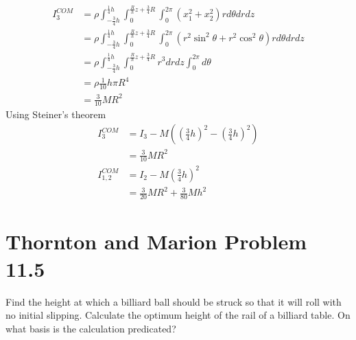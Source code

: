 \begin{equation}
    \begin{split}
        I_{3}^{COM} &= \rho \int_{-\frac{3}{4}h}^{\frac{1}{4}h} \int_0^{\frac{R}{h}z+\frac{3}{4}R} \int_0^{2\pi} (x_1^2 + x_2^2) r d\theta dr dz\\
        &= \rho \int_{-\frac{3}{4}h}^{\frac{1}{4}h} \int_0^{\frac{R}{h}z+\frac{3}{4}R} \int_0^{2\pi} (r^2 \sin^2 \theta + r^2 \cos^2 \theta) r d\theta dr dz\\
        &= \rho \int_{-\frac{3}{4}h}^{\frac{1}{4}h} \int_0^{\frac{R}{h}z+\frac{3}{4}R} r^3 dr dz\int_0^{2\pi} d \theta\\
        &=\rho \frac{1}{10}h\pi R^4\\
        &= \frac{3}{10}MR^2
    \end{split}
\end{equation}
Using Steiner's theorem
\begin{equation}
    \begin{split}
        I_{3}^{COM} &= I_3 - M \left ( \left (\frac{3}{4}h \right)^2- \left (\frac{3}{4}h \right)^2 \right)\\
        &= \frac{3}{10}MR^2\\
        I_{1,2}^{COM} &= I_2 - M \left (\frac{3}{4}h \right )^2\\
        &= \frac{3}{20}MR^2+\frac{3}{80}Mh^2
    \end{split}
\end{equation}

\section{Thornton and Marion Problem 11.5}
Find the height at which a billiard ball should be struck so that it will roll with no initial slipping. Calculate the optimum height of the rail of a billiard table. On what basis is the calculation predicated?

\begin{figure}[h]
    \centering
{}
\end{figure}

